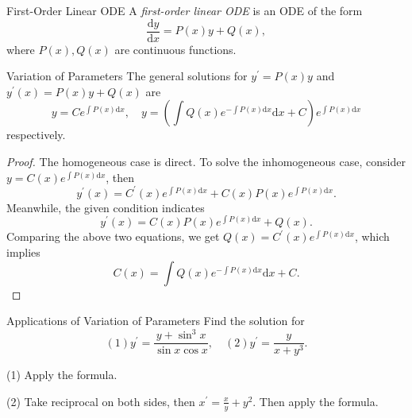 \begin{definition}{First-Order Linear ODE}{}
  A \emph{first-order linear ODE} is an ODE of the form
  \begin{equation}
    \frac{\mathrm{d} y}{\mathrm{d} x} = P(x) y + Q(x),
  \end{equation}
  where $P(x), Q(x)$ are continuous functions.
\end{definition}

\begin{proposition}{Variation of Parameters}{}
  The general solutions for $y^{\prime} = P(x)y$ and $y^{\prime}(x) = P(x)y + Q(x)$ are
  \begin{equation}
    y = C e^{\int P(x)\mathrm{d} x}, \quad
    y = \left( \int Q(x) e^{-\int P(x)\mathrm{d} x}\mathrm{d} x + C \right) e^{\int P(x)\mathrm{d} x}
  \end{equation}
  respectively.
\end{proposition}

\begin{proof}
  The homogeneous case is direct. To solve the inhomogeneous case,
  consider $y = C(x)e^{\int P(x) \mathrm{d} x}$, then
  \begin{equation}
    y^{\prime}(x) = C^{\prime}(x) e^{\int P(x)\mathrm{d} x} + C(x) P(x) e^{\int P(x)\mathrm{d} x}.
  \end{equation}
  Meanwhile, the given condition indicates
  \begin{equation}
    y^{\prime}(x) = C(x)P(x)e^{\int P(x)\mathrm{d} x} + Q(x).
  \end{equation}
  Comparing the above two equations, we get $Q(x) = C^{\prime}(x) e^{\int P(x)\mathrm{d} x}$,
  which implies
  \begin{equation}
    C(x) = \int Q(x) e^{-\int P(x)\mathrm{d} x} \mathrm{d} x + C.
  \end{equation}
\end{proof}

\begin{example}{Applications of Variation of Parameters}{}
  Find the solution for
  \begin{equation}
    (1) y^{\prime} = \frac{y + \sin^3 x}{\sin x \cos x}, \quad
    (2) y^{\prime} = \frac{y}{x + y^3}.
  \end{equation}
\end{example}

\begin{solution}
  (1) Apply the formula.

  (2) Take reciprocal on both sides, then $x^{\prime} = \frac{x}{y} + y^2$. Then apply the formula.
\end{solution}

